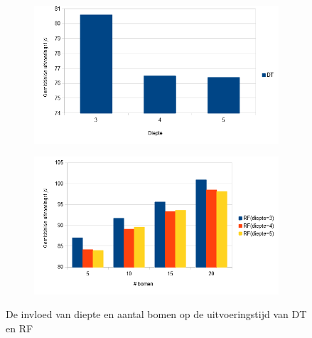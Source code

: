 \begin{figure}[htp!]
\centering
\begin{subfigure}{\textwidth}
  \centering
  \includegraphics[width=\linewidth]{images/evaluatie/uitvoeringstijddt.png}
\end{subfigure}
\begin{subfigure}{\textwidth}
  \centering
  \includegraphics[width=\linewidth]{images/evaluatie/uitvoeringstijdrf.png}
\end{subfigure}
\caption{De invloed van diepte en aantal bomen op de uitvoeringstijd van DT en RF}
\label{fig:invloed diepte en aantal bomen uitvoeringstijd}
\end{figure}
\newpage
